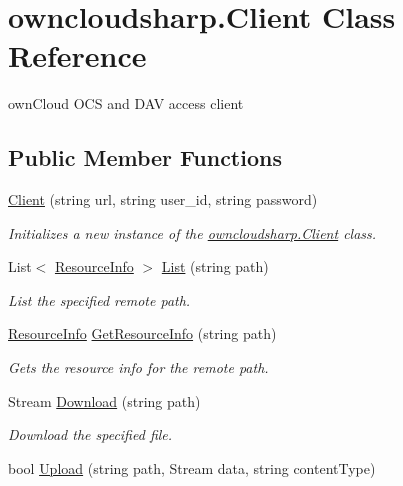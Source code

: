 \hypertarget{classowncloudsharp_1_1_client}{}\section{owncloudsharp.\+Client Class Reference}
\label{classowncloudsharp_1_1_client}


own\+Cloud O\+CS and D\+AV access client  


\subsection*{Public Member Functions}
\begin{DoxyCompactItemize}
\item 
\hyperlink{classowncloudsharp_1_1_client_a67d23283e5c2cfb84a2c170888992f19}{Client} (string url, string user\+\_\+id, string password)
\begin{DoxyCompactList}\small\item\em Initializes a new instance of the \hyperlink{classowncloudsharp_1_1_client}{owncloudsharp.\+Client} class. \end{DoxyCompactList}\item 
List$<$ \hyperlink{classowncloudsharp_1_1_types_1_1_resource_info}{Resource\+Info} $>$ \hyperlink{classowncloudsharp_1_1_client_a914c144ebbe207958829523f7eda3609}{List} (string path)
\begin{DoxyCompactList}\small\item\em List the specified remote path. \end{DoxyCompactList}\item 
\hyperlink{classowncloudsharp_1_1_types_1_1_resource_info}{Resource\+Info} \hyperlink{classowncloudsharp_1_1_client_aa482194c404ccba36a4095b513c4cf7a}{Get\+Resource\+Info} (string path)
\begin{DoxyCompactList}\small\item\em Gets the resource info for the remote path. \end{DoxyCompactList}\item 
Stream \hyperlink{classowncloudsharp_1_1_client_a3a71b182537b36e924e7df1ae3bbac89}{Download} (string path)
\begin{DoxyCompactList}\small\item\em Download the specified file. \end{DoxyCompactList}\item 
bool \hyperlink{classowncloudsharp_1_1_client_a17ce25a3959149a647f91340be7b3f8d}{Upload} (string path, Stream data, string content\+Type)

\end{DoxyCompactItemize}
